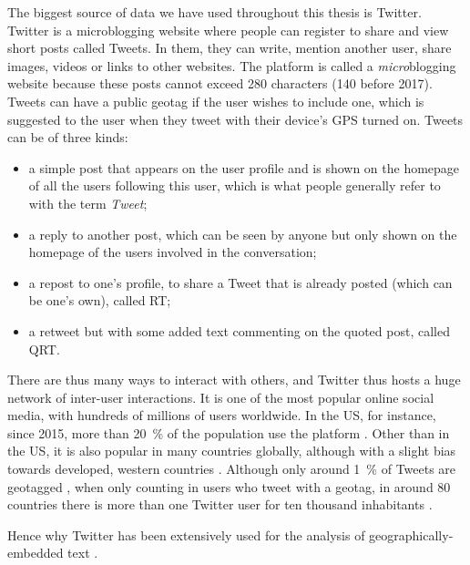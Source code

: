 \documentclass[../thesis.tex]{subfiles}
\begin{document}
The biggest source of data we have used throughout this thesis is Twitter. Twitter is a
microblogging website where people can register to share and view short posts called
Tweets. In them, they can write, mention another user, share images, videos or links to
other websites. The platform is called a \emph{micro}blogging website because these
posts cannot exceed 280 characters (140 before 2017). Tweets
can have a public geotag if the user wishes to include one, which is suggested to the
user when they tweet with their device's GPS turned on. Tweets can be of three kinds:
\begin{itemize}
  \item a simple post that appears on the user profile and is shown on the homepage of
  all the users following this user, which is what people generally refer to with the
  term \emph{Tweet};
  \item a reply to another post, which can be seen by anyone but only shown on the
  homepage of the users involved in the conversation;
  \item a repost to one's profile, to share a Tweet that is already posted (which can be
  one's own), called \ac{RT};
  \item a retweet but with some added text commenting on the quoted post, called
  \ac{QRT}.
\end{itemize}
There are thus many ways to interact with others, and Twitter thus hosts a huge network
of inter-user interactions. It is one of the most popular online social media, with
hundreds of millions of users worldwide. In the US, for instance, since 2015, more than
\SI{20}{\percent} of the population use the platform \cite{AuxierSocialMedia2021}. Other
than in the US, it is also popular in many countries globally, although with a slight
bias towards developed, western countries \cite{HawelkaGeolocatedTwitter2014}. Although
only around \SI{1}{\percent} of Tweets are geotagged \cite{MorstatterSampleGood2021},
when only counting in users who tweet with a geotag, in around 80 countries there is more
than one Twitter user for ten thousand inhabitants \cite{MocanuTwitterBabel2013}.

Hence why Twitter has been extensively used for the analysis of geographically-embedded
text \cite{ArthurHumanGeography2019, BokanyiRaceReligion2016, BokanyiScalingWords2019,
GoncalvesCrowdsourcingDialect2014, GoncalvesLearningSpanish2016,
GoncalvesMappingAmericanization2018, GrieveMappingLexical2019,
HuangUnderstandingRegional2016, KoyluUncoveringGeoSocial2018, MocanuTwitterBabel2013,
NguyenAudienceUse2015}.
\end{document}
